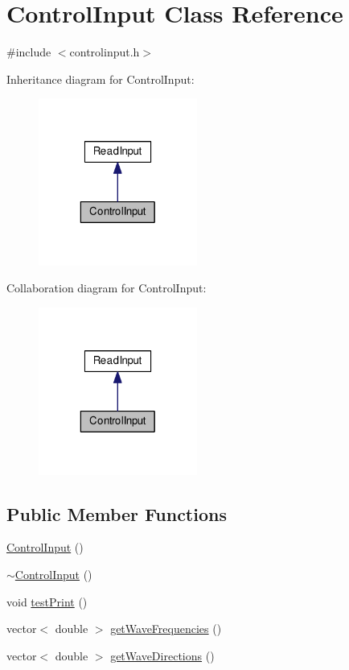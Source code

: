 \hypertarget{class_control_input}{\section{Control\-Input Class Reference}
\label{class_control_input}
}


{\ttfamily \#include $<$controlinput.\-h$>$}



Inheritance diagram for Control\-Input\-:\nopagebreak
\begin{figure}[H]
\begin{center}
\leavevmode
\includegraphics[width=148pt]{class_control_input__inherit__graph}
\end{center}
\end{figure}


Collaboration diagram for Control\-Input\-:\nopagebreak
\begin{figure}[H]
\begin{center}
\leavevmode
\includegraphics[width=148pt]{class_control_input__coll__graph}
\end{center}
\end{figure}
\subsection*{Public Member Functions}
\begin{DoxyCompactItemize}
\item 
\hyperlink{class_control_input_a50dc4cde4f6410238119971b6934c63a}{Control\-Input} ()
\item 
\hyperlink{class_control_input_aa35022d7c6edbfef7150eb4db594ba58}{$\sim$\-Control\-Input} ()
\item 
void \hyperlink{class_control_input_a2f95d64805ed477f78bf778bb786b30b}{test\-Print} ()
\item 
vector$<$ double $>$ \hyperlink{class_control_input_a3febc929e09306f21f484249c89dbc80}{get\-Wave\-Frequencies} ()
\item 
vector$<$ double $>$ \hyperlink{class_control_input_a2e80de357be6fe5112add0f5066c6328}{get\-Wave\-Directions} ()
\end{DoxyCompactItemize}
